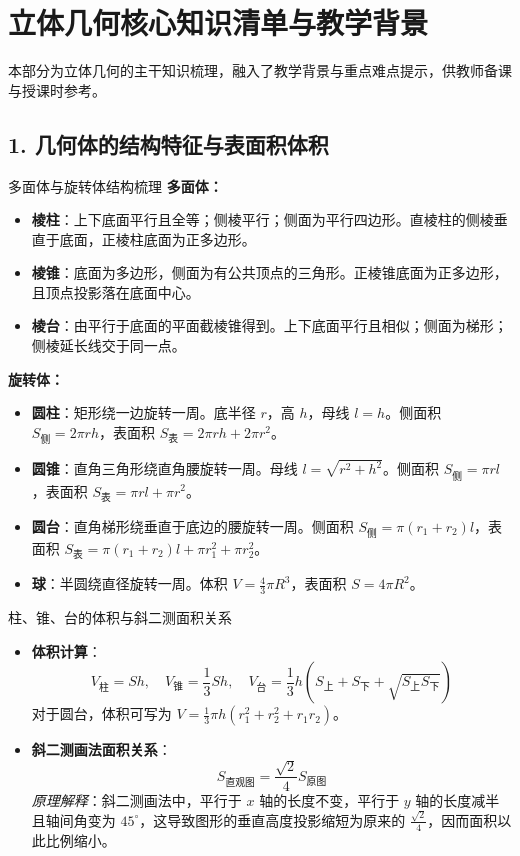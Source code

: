 \documentclass[11pt,a4paper]{ctexart}
\begin{document}
\section{立体几何核心知识清单与教学背景}

本部分为立体几何的主干知识梳理，融入了教学背景与重点难点提示，供教师备课与授课时参考。

\subsection{1. 几何体的结构特征与表面积体积}

\begin{teachbox}{多面体与旋转体结构梳理}
\textbf{多面体：}
\begin{itemize}
  \item \textbf{棱柱}：上下底面平行且全等；侧棱平行；侧面为平行四边形。直棱柱的侧棱垂直于底面，正棱柱底面为正多边形。
  \item \textbf{棱锥}：底面为多边形，侧面为有公共顶点的三角形。正棱锥底面为正多边形，且顶点投影落在底面中心。
  \item \textbf{棱台}：由平行于底面的平面截棱锥得到。上下底面平行且相似；侧面为梯形；侧棱延长线交于同一点。
\end{itemize}
\textbf{旋转体：}
\begin{itemize}
  \item \textbf{圆柱}：矩形绕一边旋转一周。底半径 $r$，高 $h$，母线 $l = h$。侧面积 $S_{\text{侧}} = 2\pi rh$，表面积 $S_{\text{表}} = 2\pi rh + 2\pi r^2$。
  \item \textbf{圆锥}：直角三角形绕直角腰旋转一周。母线 $l = \sqrt{r^2 + h^2}$。侧面积 $S_{\text{侧}} = \pi rl$，表面积 $S_{\text{表}} = \pi rl + \pi r^2$。
  \item \textbf{圆台}：直角梯形绕垂直于底边的腰旋转一周。侧面积 $S_{\text{侧}} = \pi(r_1+r_2)l$，表面积 $S_{\text{表}} = \pi(r_1+r_2)l + \pi r_1^2 + \pi r_2^2$。
  \item \textbf{球}：半圆绕直径旋转一周。体积 $V = \frac{4}{3}\pi R^3$，表面积 $S = 4\pi R^2$。
\end{itemize}
\end{teachbox}

\begin{teachbox}{柱、锥、台的体积与斜二测面积关系}
\begin{itemize}
  \item \textbf{体积计算}：
    \[ V_{\text{柱}} = Sh, \quad V_{\text{锥}} = \frac{1}{3}Sh, \quad V_{\text{台}} = \frac{1}{3}h(S_{\text{上}} + S_{\text{下}} + \sqrt{S_{\text{上}}S_{\text{下}}}) \]
    对于圆台，体积可写为 $V = \frac{1}{3}\pi h(r_1^2 + r_2^2 + r_1 r_2)$。
  \item \textbf{斜二测画法面积关系}：
    \[ S_{\text{直观图}} = \frac{\sqrt{2}}{4} S_{\text{原图}} \]
    \textit{原理解释}：斜二测画法中，平行于 $x$ 轴的长度不变，平行于 $y$ 轴的长度减半且轴间角变为 $45^\circ$，这导致图形的垂直高度投影缩短为原来的 $\frac{\sqrt{2}}{4}$，因而面积以此比例缩小。
\end{itemize}
\end{teachbox}
\end{document}
